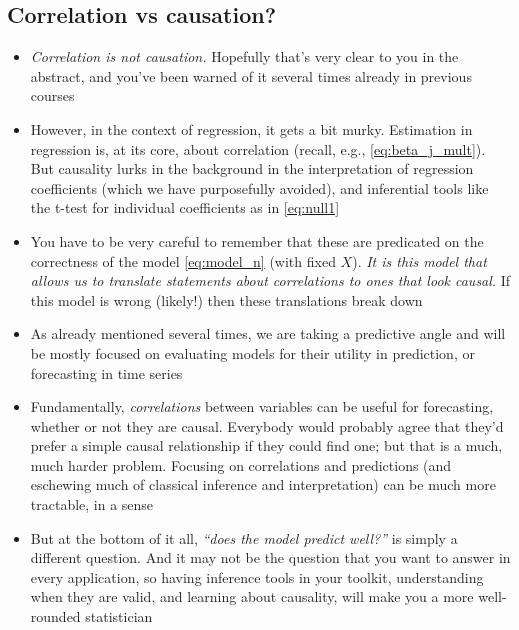 \documentclass{article}
\begin{document}
\subsection{Correlation vs causation?}

\begin{itemize}
\item \emph{Correlation is not causation.} Hopefully that's very clear to you in
  the abstract, and you've been warned of it several times already in previous
  courses

\item However, in the context of regression, it gets a bit murky. Estimation in
  regression is, at its core, about correlation (recall, e.g.,
  \eqref{eq:beta_j_mult}). But causality lurks in the background in the
  interpretation of regression coefficients (which we have purposefully
  avoided), and inferential tools like the t-test for individual coefficients as
  in \eqref{eq:null1}    

\item You have to be very careful to remember that these are predicated on the
  correctness of the model \eqref{eq:model_n} (with fixed $X$). \emph{It is this
    model that allows us to translate statements about correlations to ones that
    look causal.} If this model is wrong (likely!) then these translations break
  down 

\item As already mentioned several times, we are taking a predictive angle and
  will be mostly focused on evaluating models for their utility in prediction,
  or forecasting in time series

\item Fundamentally, \emph{correlations} between variables can be useful for
  forecasting, whether or not they are causal. Everybody would probably agree
  that they'd prefer a simple causal relationship if they could find one; but
  that is a much, much harder problem. Focusing on correlations and predictions
  (and eschewing much of classical inference and interpretation) can be much
  more tractable, in a sense

\item But at the bottom of it all, \emph{``does the model predict well?''} is
  simply a different question. And it may not be the question that you want to
  answer in every application, so having inference tools in your toolkit,
  understanding when they are valid, and learning about causality, will make you
  a more well-rounded statistician
\end{itemize}
\end{document}
